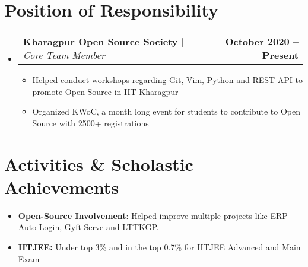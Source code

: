 \documentclass[letterpaper,11pt]{article}
\makeatletter
\newcommand{\resumeItem}[1]{
  \item\small{
    {#1 \vspace{-2pt}}
  }
}
\newcommand{\resumeProjectHeading}[2]{
    \item
    \begin{tabular*}{1.001\textwidth}{l@{\extracolsep{\fill}}r}
      \small#1 & \textbf{\small #2}\\
    \end{tabular*}\vspace{-7pt}
}
\newcommand{\resumeSubHeadingListStart}{\begin{itemize}[leftmargin=0.0in, label={}]}
\newcommand{\resumeSubHeadingListEnd}{\end{itemize}}
\newcommand{\resumeItemListStart}{\begin{itemize}}
\newcommand{\resumeItemListEnd}{\end{itemize}\vspace{-5pt}}
\makeatother
\begin{document}
\section{Position of Responsibility}
\resumeSubHeadingListStart
    \resumeProjectHeading
    {\textbf{\href{https://github.com/kgpyaar-tech}{Kharagpur Open Source Society}} $|$ \emph{Core Team Member}}{October 2020 -- Present}
    \resumeItemListStart
    \resumeItem{Helped conduct workshops regarding Git, Vim, Python and REST API to promote Open Source in IIT Kharagpur}
    \resumeItem{Organized KWoC, a month long event for students to contribute to Open Source with 2500+ registrations}
    \resumeItemListEnd
\resumeSubHeadingListEnd

\section{Activities \& Scholastic Achievements}
\begin{itemize}[leftmargin=0.15in, label={}]
\item \textbf{Open-Source Involvement}: Helped improve multiple projects like {\href{https://github.com/metakgp/erp-auto-login} {\underline{ERP Auto-Login}}}, {\href {https://github.com/metakgp/gyft-serve}{\underline{Gyft Serve}}} and {\href{https://github.com/lttkgp}{\underline{LTTKGP}}}.


\item\textbf{IITJEE:} Under top 3\% and in the top 0.7\% for IITJEE Advanced and Main Exam



\end{itemize}


\end{document}
